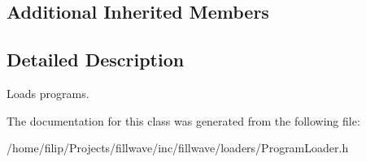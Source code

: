 \subsection*{Additional Inherited Members}


\subsection{Detailed Description}
Loads programs. 

The documentation for this class was generated from the following file\+:\begin{DoxyCompactItemize}
\item 
/home/filip/\+Projects/fillwave/inc/fillwave/loaders/Program\+Loader.\+h\end{DoxyCompactItemize}
